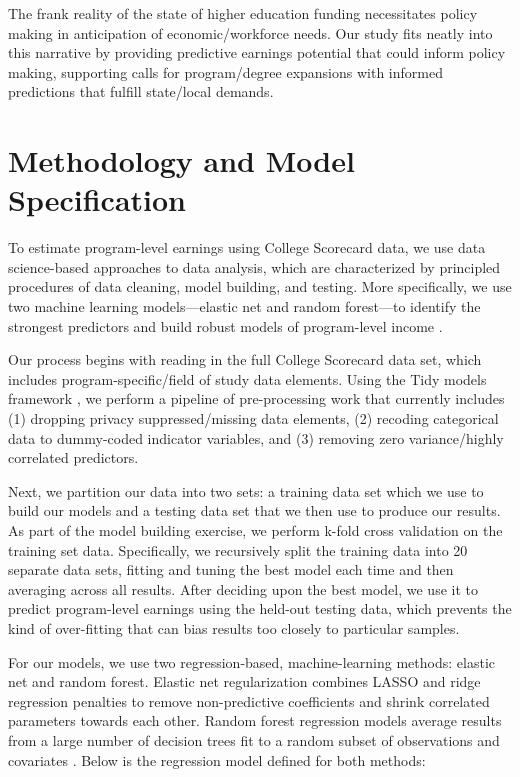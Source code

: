 \documentclass[a4paper, 12pt]{article}
\begin{document}
The frank reality of the state of higher education funding
necessitates policy making in anticipation of economic/workforce
needs. Our study fits neatly into this narrative by providing
predictive earnings potential that could inform policy making,
supporting calls for program/degree expansions with informed
predictions that fulfill state/local demands.

\section*{Methodology and Model Specification}

To estimate program-level earnings using College Scorecard data, we
use data science-based approaches to data analysis, which are
characterized by principled procedures of data cleaning, model
building, and testing. More specifically, we use two machine learning
models---elastic net and random forest---to identify the strongest
predictors and build robust models of program-level income
\parencite{Hastie_etal_2016, Kuhn_Silge_2022}.

Our process begins with reading in the full College Scorecard data
set, which includes program-specific/field of study data
elements. Using the Tidy models framework \parencite{Kuhn_Silge_2022},
we perform a pipeline of pre-processing work that currently includes
(1) dropping privacy suppressed/missing data elements, (2) recoding
categorical data to dummy-coded indicator variables, and (3) removing
zero variance/highly correlated predictors.

Next, we partition our data into two sets: a training data set which
we use to build our models and a testing data set that we then use to
produce our results. As part of the model building exercise, we
perform k-fold cross validation on the training set
data. Specifically, we recursively split the training data into 20
separate data sets, fitting and tuning the best model each time and
then averaging across all results. After deciding upon the best model,
we use it to predict program-level earnings using the held-out testing
data, which prevents the kind of over-fitting that can bias results
too closely to particular samples.

For our models, we use two regression-based, machine-learning methods:
elastic net and random forest. Elastic net regularization combines
LASSO and ridge regression penalties to remove non-predictive
coefficients and shrink correlated parameters towards each
other. Random forest regression models average results from a large
number of decision trees fit to a random subset of observations and
covariates \parencite{Hastie_etal_2016}. Below is the regression model
defined for both methods:
\end{document}
